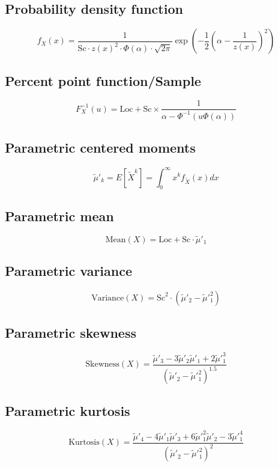 \documentclass{article}
\begin{document}
\subsection{Probability density function}
\begin{equation*} f_{X}\left(x\right)=\frac{1}{\text{Sc}\cdot z(x)^{2}\cdot \Phi\left(\alpha\right)\cdot\sqrt{2\pi}}\exp\left(-\frac{1}{2}\left(\alpha-\frac{1}{z(x)}\right)^{2}\right) \end{equation*}
\subsection{Percent point function/Sample}
\begin{equation*} F_{X}^{-1}\left(u\right)=\text{Loc}+\text{Sc}\times \frac{1}{\alpha-\Phi^{-1}\left(u\Phi\left(\alpha\right)\right)} \end{equation*}
\subsection{Parametric centered moments}
\begin{equation*} \tilde{\mu}'_{k}=E[\tilde{X}^k]=\int_{0}^{\infty}x^{k}f_{\tilde{X}}\left(x\right)dx \end{equation*}
\subsection{Parametric mean}
\begin{equation*} \mathrm{Mean}(X)=\text{Loc}+\text{Sc}\cdot\tilde{\mu}'_{1} \end{equation*}
\subsection{Parametric variance}
\begin{equation*} \mathrm{Variance}(X)=\text{Sc}^{2}\cdot(\tilde{\mu}'_{2}-\tilde{\mu}'^{2}_{1}) \end{equation*}
\subsection{Parametric skewness}
\begin{equation*} \mathrm{Skewness}(X)=\frac{\tilde{\mu}'_{3}-3\tilde{\mu}'_{2}\tilde{\mu}'_{1}+2\tilde{\mu}'^{3}_{1}}{(\tilde{\mu}'_{2}-\tilde{\mu}'^{2}_{1})^{1.5}} \end{equation*}
\subsection{Parametric kurtosis}
\begin{equation*} \mathrm{Kurtosis}(X)=\frac{\tilde{\mu}'_{4}-4\tilde{\mu}'_{1}\tilde{\mu}'_{3}+6\tilde{\mu}'^{2}_{1}\tilde{\mu}'_{2}-3\tilde{\mu}'^{4}_{1}}{(\tilde{\mu}'_{2}-\tilde{\mu}'^{2}_{1})^{2}} \end{equation*}
\end{document}
